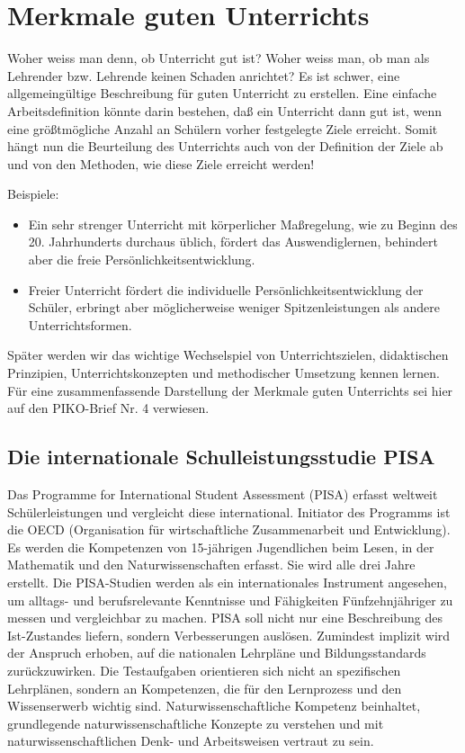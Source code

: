 \chapter{Merkmale guten Unterrichts}\label{GuterUnterricht}
Woher weiss man denn, ob Unterricht gut ist? Woher weiss man, ob man als Lehrender bzw. Lehrende keinen Schaden 
anrichtet? Es ist schwer,  eine allgemeing{\"u}ltige Beschreibung f{\"u}r guten Unterricht zu erstellen. Eine einfache Arbeitsdefinition k{\"o}nnte darin
bestehen, da{\ss} ein Unterricht dann gut ist, wenn eine gr{\"o}{\ss}tm{\"o}gliche Anzahl an Sch{\"u}lern vorher
festgelegte Ziele erreicht. Somit h{\"a}ngt nun die Beurteilung des Unterrichts auch von der Definition der Ziele ab und von den Methoden, wie diese Ziele erreicht werden!

\mip
Beispiele: 
\begin{itemize}
\item
Ein sehr strenger Unterricht mit k{\"o}rperlicher Ma{\ss}regelung, wie zu Beginn des 20. Jahrhunderts durchaus {\"u}blich,
f{\"o}rdert das Auswendiglernen, behindert aber die freie Pers{\"o}nlichkeitsentwicklung.
\item
Freier Unterricht f{\"o}rdert die individuelle Pers{\"o}nlichkeitsentwicklung der Sch{\"u}ler, erbringt aber 
m{\"o}glicherweise weniger Spitzenleistungen als andere Unterrichtsformen.
\end{itemize}

Sp{\"a}ter werden wir das wichtige Wechselspiel von Unterrichtszielen, didaktischen Prinzipien, Unterrichtskonzepten und 
methodischer Umsetzung kennen lernen. F{\"u}r eine zusammenfassende Darstellung der Merkmale guten Unterrichts sei
hier auf den PIKO-Brief Nr. 4 verwiesen.

\bip\bip
\section{Die internationale Schulleistungsstudie PISA}
Das {\glqq}Programme for International Student Assessment{\grqq} (PISA) erfasst weltweit Sch{\"u}lerleistungen und vergleicht diese international. 
Initiator des Programms ist die OECD (Organisation f{\"u}r wirtschaftliche Zusammenarbeit und Entwicklung). Es werden 
 die Kompetenzen von 15-j{\"a}hrigen Jugendlichen beim Lesen, in der Mathematik
und den Naturwissenschaften erfasst. Sie wird alle drei Jahre erstellt. Die PISA-Studien werden als ein internationales 
Instrument angesehen, um alltags- und berufsrelevante Kenntnisse und F{\"a}higkeiten F{\"u}nfzehnj{\"a}hriger zu messen und vergleichbar zu machen.
PISA soll nicht nur eine Beschreibung des Ist-Zustandes liefern, sondern Verbesserungen ausl{\"o}sen. Zumindest  implizit wird der Anspruch 
erhoben, auf die nationalen Lehrpl{\"a}ne und Bildungsstandards zur{\"u}ckzuwirken.
\mip
Die Testaufgaben orientieren sich nicht an spezifischen Lehrpl\"{a}nen, sondern an Kompetenzen, die f{\"u}r den
Lernprozess und den Wissenserwerb wichtig sind. Naturwissenschaftliche Kompetenz beinhaltet, grundlegende 
naturwissenschaftliche Konzepte zu verstehen und mit naturwissenschaftlichen Denk- und Arbeitsweisen
vertraut zu sein.  

